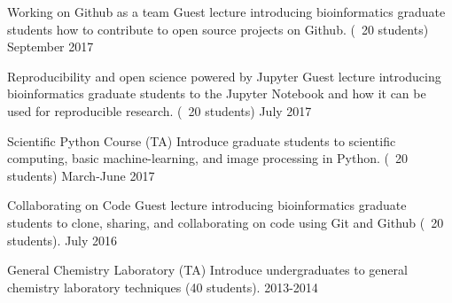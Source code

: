 
\begin{cvteaching}


  \cvteach
    {Working on Github as a team}
    {Guest lecture introducing bioinformatics graduate students how to contribute to open source projects on Github. (~20 students)}
    {September 2017}

  \cvteach
    {Reproducibility and open science powered by Jupyter}
    {Guest lecture introducing bioinformatics graduate students to the Jupyter Notebook and how it can be used for reproducible research. (~20 students)}
    {July 2017}

  \cvteach
    {Scientific Python Course (TA)}
    {Introduce graduate students to scientific computing, basic machine-learning, and image processing in Python. (~20 students)}
    {March-June 2017}

  \cvteach
    {Collaborating on Code}
    {Guest lecture introducing bioinformatics graduate students to clone, sharing, and collaborating on code using Git and Github (~20 students).}
    {July 2016}

  \cvteach
    {General Chemistry Laboratory (TA)}
    {Introduce undergraduates to general chemistry laboratory techniques (40 students).}
    {2013-2014}

\end{cvteaching}
